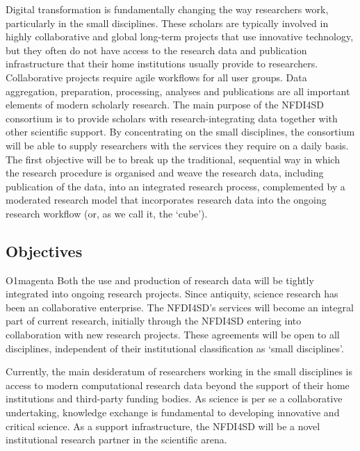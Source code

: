 \documentclass[
  english,
  paper=a4,
  oneside,captions=tableheading
]{scrbook}
\begin{document}
Digital transformation is fundamentally changing the way researchers
work, particularly in the small disciplines. These scholars are
typically involved in highly collaborative and global long-term projects
that use innovative technology, but they often do not have access to the
research data and publication infrastructure that their home
institutions usually provide to researchers. Collaborative projects
require agile workflows for all user groups. Data aggregation,
preparation, processing, analyses and publications are all important
elements of modern scholarly research. The main purpose of the NFDI4SD
consortium is to provide scholars with research-integrating data
together with other scientific support. By concentrating on the small
disciplines, the consortium will be able to supply researchers with the
services they require on a daily basis. The first objective will be to
break up the traditional, sequential way in which the research procedure
is organised and weave the research data, including publication of the
data, into an integrated research process, complemented by a moderated
research model that incorporates research data into the ongoing research
workflow (or, as we call it, the `cube').

\hypertarget{objectives}{%
\subsection{Objectives}\label{objectives}}

\begin{awesomeblock}[magenta]{1pt}{O1}{magenta} Both the use and production of research data will be tightly integrated into ongoing research projects. Since antiquity, science research has been an collaborative enterprise. The NFDI4SD’s services will become an integral part of current research, initially through the NFDI4SD entering into collaboration with new research projects. These agreements will be open to all disciplines, independent of their institutional classification as ‘small disciplines’.\end{awesomeblock}

Currently, the main desideratum of researchers working in the small
disciplines is access to modern computational research data beyond the
support of their home institutions and third-party funding bodies. As
science is per se a collaborative undertaking, knowledge exchange is
fundamental to developing innovative and critical science. As a support
infrastructure, the NFDI4SD will be a novel institutional research
partner in the scientific arena.
\end{document}
